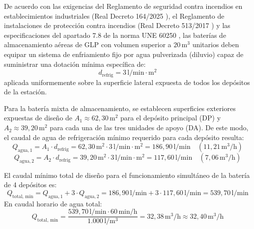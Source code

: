 \documentclass[12pt]{article}
\begin{document}
        De acuerdo con las exigencias del Reglamento de seguridad contra incendios en establecimientos industriales (Real Decreto 164/2025 \cite{rd164}), el Reglamento de instalaciones de protección contra incendios (Real Decreto 513/2017 \cite{rd513}) y las especificaciones del apartado 7.8 de la norma UNE 60250 \cite{une60250}, las baterías de almacenamiento aéreas de GLP con volumen superior a $20\,\text{m}^3$ unitarios deben equipar un sistema de enfriamiento fijo por agua pulverizada (diluvio) capaz de suministrar una dotación mínima específica de:
        \begin{equation}
            d_{\text{refrig}} = 3\,\text{l}/\text{min}\cdot\text{m}^2
        \end{equation}
        aplicada uniformemente sobre la superficie lateral expuesta de todos los depósitos de la estación.

        Para la batería mixta de almacenamiento, se establecen superficies exteriores expuestas de diseño de $A_1 \approx 62,30\,\text{m}^2$ para el depósito principal (DP) y $A_2 \approx 39,20\,\text{m}^2$ para cada una de las tres unidades de apoyo (DA). De este modo, el caudal de agua de refrigeración mínimo requerido para cada depósito resulta:
        \begin{equation}
            Q_{\text{agua}, 1} = A_1 \cdot d_{\text{refrig}} = 62,30\,\text{m}^2 \cdot 3\,\text{l}/\text{min}\cdot\text{m}^2 = 186,90\,\text{l}/\text{min} \quad (11,21\,\text{m}^3/\text{h})
        \end{equation}
        \begin{equation}
            Q_{\text{agua}, 2} = A_2 \cdot d_{\text{refrig}} = 39,20\,\text{m}^2 \cdot 3\,\text{l}/\text{min}\cdot\text{m}^2 = 117,60\,\text{l}/\text{min} \quad (7,06\,\text{m}^3/\text{h})
        \end{equation}

        El caudal mínimo total de diseño para el funcionamiento simultáneo de la batería de 4 depósitos es:
        \begin{equation}
            Q_{\text{total, min}} = Q_{\text{agua}, 1} + 3 \cdot Q_{\text{agua}, 2} = 186,90\,\text{l}/\text{min} + 3 \cdot 117,60\,\text{l}/\text{min} = 539,70\,\text{l}/\text{min}
        \end{equation}
        En caudal horario de agua total:
        \begin{equation}
            Q_{\text{total, min}} = \frac{539,70\,\text{l}/\text{min} \cdot 60\,\text{min}/\text{h}}{1.000\,\text{l}/\text{m}^3} = 32,38\,\text{m}^3/\text{h} \approx 32,40\,\text{m}^3/\text{h}
        \end{equation}
\end{document}

